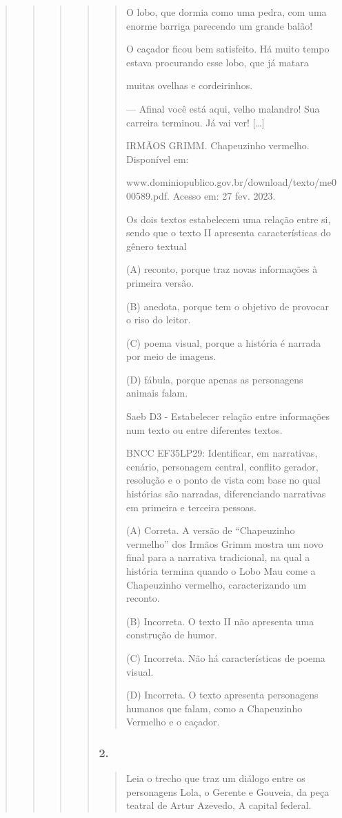\begin{quote}
\begin{quote}
\begin{quote}
\begin{quote}
\begin{quote}
O lobo, que dormia como uma pedra, com uma enorme barriga parecendo um
grande balão!

O caçador ficou bem satisfeito. Há muito tempo estava procurando esse
lobo, que já matara

muitas ovelhas e cordeirinhos.

--- Afinal você está aqui, velho malandro! Sua carreira terminou. Já vai
ver! {[}\ldots{}{]}

IRMÃOS GRIMM. Chapeuzinho vermelho. Disponível em:

www.dominiopublico.gov.br/download/texto/me000589.pdf. Acesso em: 27
fev. 2023.

Os dois textos estabelecem uma relação entre si, sendo que o texto II
apresenta características do gênero textual

(A) reconto, porque traz novas informações à primeira versão.

(B) anedota, porque tem o objetivo de provocar o riso do leitor.

(C) poema visual, porque a história é narrada por meio de imagens.

(D) fábula, porque apenas as personagens animais falam.

Saeb D3 - Estabelecer relação entre informações num texto ou entre
diferentes textos.

BNCC EF35LP29: Identificar, em narrativas, cenário, personagem central,
conflito gerador, resolução e o ponto de vista com base no qual
histórias são narradas, diferenciando narrativas em primeira e terceira
pessoas.

(A) Correta. A versão de ``Chapeuzinho vermelho'' dos Irmãos Grimm
mostra um novo final para a narrativa tradicional, na qual a história
termina quando o Lobo Mau come a Chapeuzinho vermelho, caracterizando um
reconto.

(B) Incorreta. O texto II não apresenta uma construção de humor.

(C) Incorreta. Não há características de poema visual.

(D) Incorreta. O texto apresenta personagens humanos que falam, como a
Chapeuzinho Vermelho e o caçador.
\end{quote}

\subsubsection{2. }\label{section-85}

\begin{quote}
Leia o trecho que traz um diálogo entre os personagens Lola, o Gerente e
Gouveia, da peça teatral de Artur Azevedo, A capital federal.


\end{quote}
\end{quote}
\end{quote}
\end{quote}
\end{quote}
